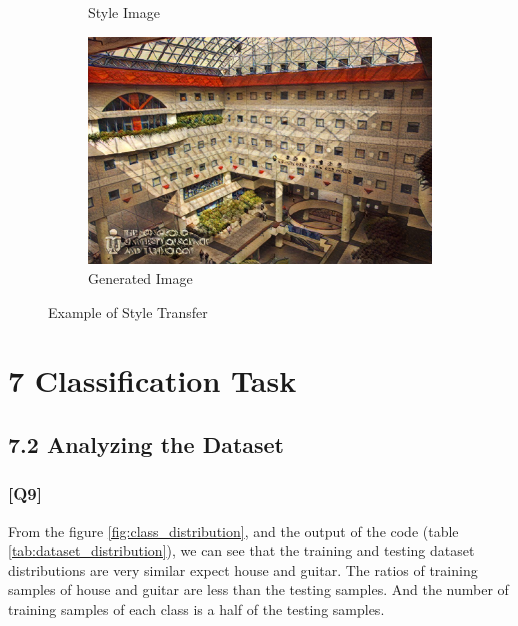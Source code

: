 \documentclass{article}
\begin{document}
\begin{figure}[h!]
\begin{minipage}{\textwidth}
\begin{subfigure}{0.25\textwidth}
            \caption{Style Image}
        \end{subfigure}
        \hfill %
        \begin{subfigure}{0.25\textwidth}
            \includegraphics[width=\textwidth]{./part1_inference/output_14_sandro-botticelli_crucifixion(1).jpg}
            \caption{Generated Image}
        \end{subfigure}
    \end{minipage}    
    
    \caption{Example of Style Transfer}
    \label{fig:part1_inference}
\end{figure}

\newpage

\section*{7 Classification Task}

\subsection*{7.2 Analyzing the Dataset}

\subsubsection*{[Q9]}

From the figure \ref{fig:class_distribution}, and the output of the code (table \ref{tab:dataset_distribution}), 
we can see that the training and testing dataset distributions are very similar expect house and guitar.
The ratios of training samples of house and guitar are less than the testing samples.
And the number of training samples of each class is a half of the testing samples.
\end{document}
